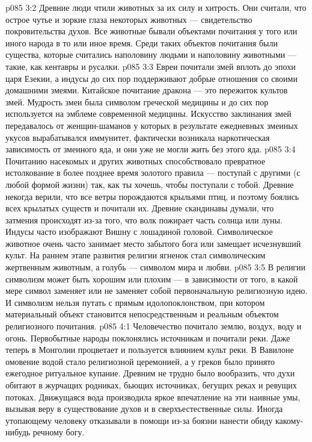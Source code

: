 \vs p085 3:2 Древние люди чтили животных за их силу и хитрость. Они считали, что острое чутье и зоркие глаза некоторых животных --- свидетельство покровительства духов. Все животные бывали объектами почитания у того или иного народа в то или иное время. Среди таких объектов почитания были существа, которые считались наполовину людьми и наполовину животными --- такие, как кентавры и русалки.
\vs p085 3:3 Евреи почитали змей вплоть до эпохи царя Езекии, а индусы до сих пор поддерживают добрые отношения со своими домашними змеями. Китайское почитание дракона --- это пережиток культов змей. Мудрость змеи была символом греческой медицины и до сих пор используется на эмблеме современной медицины. Искусство заклинания змей передавалось от женщин\hyp{}шаманов  у которых в результате ежедневных змеиных укусов вырабатывался иммунитет, фактически возникала наркотическая зависимость от змеиного яда, и они уже не могли жить без этого яда.
\vs p085 3:4 Почитанию насекомых и других животных способствовало превратное истолкование в более позднее время золотого правила --- поступай с другими (с любой формой жизни) так, как ты хочешь, чтобы поступали с тобой. Древние некогда верили, что все ветры порождаются крыльями птиц, и поэтому боялись всех крылатых существ и почитали их. Древние скандинавы думали, что затмения происходят из\hyp{}за того, что волк пожирает часть солнца или луны. Индусы часто изображают Вишну с лошадиной головой. Символическое животное очень часто занимает место забытого бога или замещает исчезнувший культ. На раннем этапе развития религии ягненок стал символическим жертвенным животным, а голубь --- символом мира и любви.
\vs p085 3:5 В религии символизм может быть хорошим или плохим --- в зависимости от того, в какой мере символ заменяет или не заменяет собой первоначальную религиозную идею. И символизм нельзя путать с прямым идолопоклонством, при котором материальный объект становится непосредственным и реальным объектом религиозного почитания.
\vs p085 4:1 Человечество почитало землю, воздух, воду и огонь. Первобытные народы поклонялись источникам и почитали реки. Даже теперь в Монголии процветает и пользуется влиянием культ реки. В Вавилоне омовение водой стало религиозной церемонией, а у греков было принято ежегодное ритуальное купание. Древним не трудно было вообразить, что духи обитают в журчащих родниках, бьющих источниках, бегущих реках и ревущих потоках. Движущаяся вода производила яркое впечатление на эти наивные умы, вызывая веру в существование духов и в сверхъестественные силы. Иногда утопающему человеку отказывали в помощи из\hyp{}за боязни нанести обиду какому\hyp{}нибудь речному богу.
